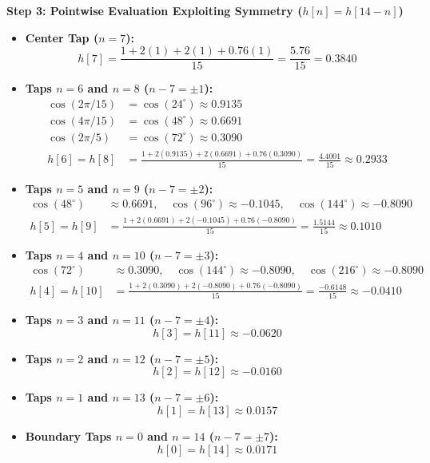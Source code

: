 \documentclass[11pt,a4paper]{article}
\begin{document}
\noindent\textbf{Step 3: Pointwise Evaluation Exploiting Symmetry ($h[n] = h[14-n]$)}
\begin{itemize}
    \item \textbf{Center Tap ($n = 7$):}
    \begin{equation}
    h[7] = \frac{1 + 2(1) + 2(1) + 0.76(1)}{15} = \frac{5.76}{15} = \mathbf{0.3840}
    \end{equation}
    \item \textbf{Taps $n = 6$ and $n = 8$ ($n - 7 = \pm 1$):}
    \begin{align}
    \cos(2\pi/15) &= \cos(24^\circ) \approx 0.9135 \nonumber \\
    \cos(4\pi/15) &= \cos(48^\circ) \approx 0.6691 \nonumber \\
    \cos(2\pi/5)  &= \cos(72^\circ) \approx 0.3090 \nonumber \\
    h[6] = h[8] &= \frac{1 + 2(0.9135) + 2(0.6691) + 0.76(0.3090)}{15} = \frac{4.4001}{15} \approx \mathbf{0.2933}
    \end{align}
    \item \textbf{Taps $n = 5$ and $n = 9$ ($n - 7 = \pm 2$):}
    \begin{align}
    \cos(48^\circ) &\approx 0.6691, \quad \cos(96^\circ) \approx -0.1045, \quad \cos(144^\circ) \approx -0.8090 \nonumber \\
    h[5] = h[9] &= \frac{1 + 2(0.6691) + 2(-0.1045) + 0.76(-0.8090)}{15} = \frac{1.5144}{15} \approx \mathbf{0.1010}
    \end{align}
    \item \textbf{Taps $n = 4$ and $n = 10$ ($n - 7 = \pm 3$):}
    \begin{align}
    \cos(72^\circ) &\approx 0.3090, \quad \cos(144^\circ) \approx -0.8090, \quad \cos(216^\circ) \approx -0.8090 \nonumber \\
    h[4] = h[10] &= \frac{1 + 2(0.3090) + 2(-0.8090) + 0.76(-0.8090)}{15} = \frac{-0.6148}{15} \approx \mathbf{-0.0410}
    \end{align}
    \item \textbf{Taps $n = 3$ and $n = 11$ ($n - 7 = \pm 4$):}
    \begin{equation}
    h[3] = h[11] \approx \mathbf{-0.0620}
    \end{equation}
    \item \textbf{Taps $n = 2$ and $n = 12$ ($n - 7 = \pm 5$):}
    \begin{equation}
    h[2] = h[12] \approx \mathbf{-0.0160}
    \end{equation}
    \item \textbf{Taps $n = 1$ and $n = 13$ ($n - 7 = \pm 6$):}
    \begin{equation}
    h[1] = h[13] \approx \mathbf{0.0157}
    \end{equation}
    \item \textbf{Boundary Taps $n = 0$ and $n = 14$ ($n - 7 = \pm 7$):}
    \begin{equation}
    h[0] = h[14] \approx \mathbf{0.0171}
    \end{equation}
\end{itemize}
\end{document}
